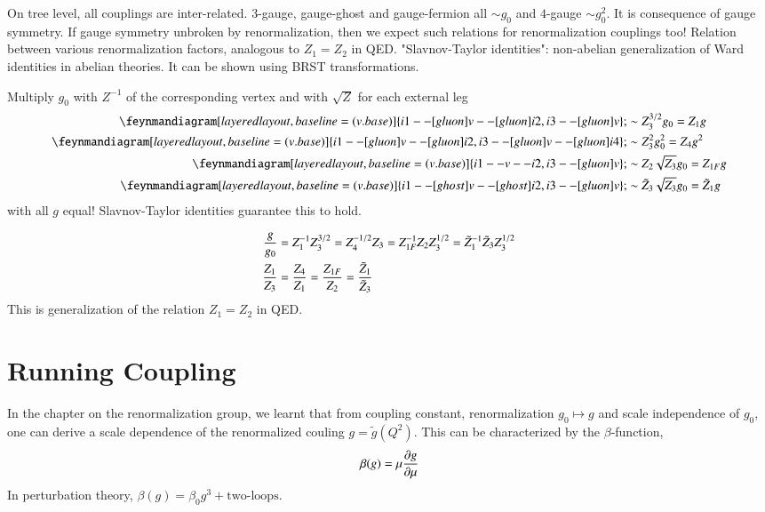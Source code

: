 On tree level, all couplings are inter-related. $3$-gauge, gauge-ghost and gauge-fermion all $\sim g_0$ and $4 $-gauge $\sim g_0^2$. It is consequence of gauge symmetry. If gauge symmetry unbroken by renormalization, then we expect such relations for renormalization couplings too!
Relation between various renormalization factors, analogous to $Z_1=Z_2$ in QED. "Slavnov-Taylor identities": non-abelian generalization of Ward identities in abelian theories. It can be shown using BRST transformations.

Multiply $g_0$ with $Z^{-1}$ of the corresponding vertex and with $\sqrt{Z}$ for each external leg
\begin{align*}
   \feynmandiagram[layered layout, baseline=(v.base)]{
      i1 --[gluon] v --[gluon] i2,
      i3 --[gluon] v
   };
      &\sim Z_3^{3/2} g_0 = Z_1 g \\
   \feynmandiagram[layered layout, baseline=(v.base)]{
      i1 --[gluon] v --[gluon] i2,
      i3 --[gluon] v --[gluon] i4
   };
   &\sim Z_3^2 g_0^2 = Z_4 g^2 \\
   \feynmandiagram[layered layout, baseline=(v.base)]{
      i1 -- v -- i2,
      i3 --[gluon] v
   };
      &\sim Z_2 \sqrt{Z_3} g_0 = Z_{1F} g \\
   \feynmandiagram[layered layout, baseline=(v.base)]{
      i1 --[ghost] v --[ghost] i2,
      i3 --[gluon] v
   };
      &\sim \tilde{Z}_3 \sqrt{Z_3} g_0 = \tilde{Z}_{1} g
\end{align*}
with all $g$ equal! Slavnov-Taylor identities guarantee this to hold. 

\begin{align}
   \frac{g}{g_0} &= Z_1^{-1} Z_3^{3/2} = Z_4^{-1/2} Z_3 = Z^{-1}_{1F} Z_2 Z_3^{1/2} = \tilde{Z}_1^{-1} \tilde{Z}_3 Z_3^{1/2} \notag \\
   \frac{Z_1}{Z_3} &= \frac{Z_4}{Z_1} = \frac{Z_{1F}}{Z_2} = \frac{\tilde{Z}_1}{\tilde{Z}_3}
\end{align}
This is generalization of the relation $Z_1 = Z_2$ in QED.

\section{Running Coupling}
In the chapter on the renormalization group, we learnt that from coupling constant, renormalization $g_0 \mapsto g$ and scale independence of  $g_0$, one can derive a scale dependence of the renormalized couling $g = \tilde{g}(Q^2)$. This can be characterized by the $\beta$-function,
\begin{align}
   \beta (g) = \mu \pdv{g}{\mu}
\end{align}
In perturbation theory, $\beta(g) = \beta_0 g^3 + \text{two-loops}$.

